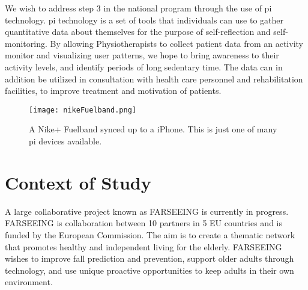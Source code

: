 We wish to address step 3 in the national program through the use of \gls{pi} technology. \gls{pi} technology is a set of tools that individuals can use to gather quantitative data about themselves for the purpose of self-reflection and self-monitoring. By allowing Physiotherapists to collect patient data from an activity monitor and visualizing user patterns, we hope to bring awareness to their activity levels, and identify periods of long sedentary time. The data can in addition be utilized in consultation with health care personnel and rehabilitation facilities, to improve treatment and motivation of patients.


\begin{figure}[h!]
	\centering
		\texttt{[image: nikeFuelband.png]}
		\caption{\footnotesize A Nike+ Fuelband synced up to a iPhone. This is just one of many \gls{pi} devices available.}
		\label{fig:nikeFuelbandPhone}
\end{figure}

\section{Context of Study}
A large collaborative project known as FARSEEING is currently in progress. FARSEEING is collaboration between 10 partners in 5 EU countries and is funded by the European Commission. The aim is to create a thematic network that promotes healthy and independent living for the elderly. FARSEEING wishes to improve fall prediction and prevention, support older adults through technology, and use unique proactive opportunities to keep adults in their own environment.

